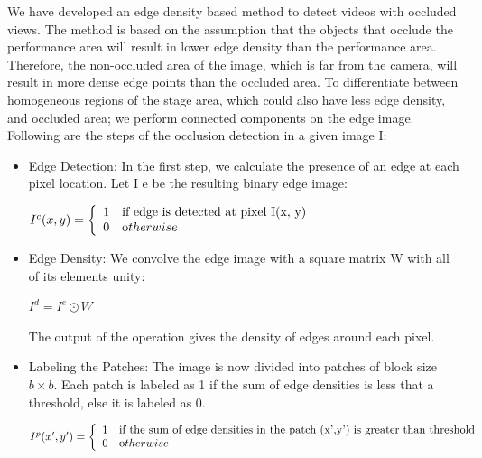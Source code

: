 \documentclass{sig-alternate-05-2015}
\begin{document}
We have developed an edge density based method to detect videos
with occluded views. The method is based on the assumption that
the objects that occlude the performance area will result in lower
edge density than the performance area. Therefore, the non-occluded
area of the image, which is far from the camera, will result in more
dense edge points than the occluded area. To differentiate between
homogeneous regions of the stage area, which could also have less edge density, and occluded area; we perform connected components on the edge image. Following are the steps of the occlusion
detection in a given image I:
\begin{itemize}
\item Edge Detection: In the first step, we calculate the presence of
an edge at each pixel location. Let I e be the resulting binary
edge image:

$I^c (x,y)= 
\left\{
	\begin{array}{ll}
		1  & \mbox{if edge is detected at pixel I(x, y) } \\
		0 & \mbox otherwise
	\end{array}
\right.$

\item Edge Density: We convolve the edge image with a square
matrix W with all of its elements unity:
\begin{center}
$I^d = I^e \odot W$
\end{center}
The output of the operation gives the density of edges around
each pixel.
\item Labeling the Patches: The image is now divided into patches
of block size $b\times b$. Each patch is labeled as 1 if the sum of
edge densities is less that a threshold, else it is labeled as 0.

$I^p (x',y')= 
\left\{
	\begin{array}{ll}
		1  & \mbox{if the sum of edge densities in the
patch (x',y') is greater than threshold} \\
		0 & \mbox otherwise
	\end{array}
\right.$


\end{itemize}
\end{document}
